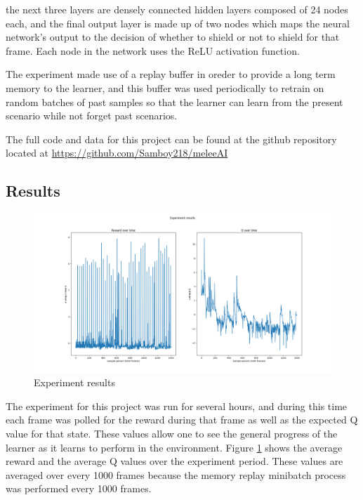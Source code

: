 \documentclass{article}
\begin{document}
the next three layers are densely connected hidden layers composed of 24 nodes each, and the final output layer is made up of
two nodes which maps the neural network's output to the decision of whether to shield or not to shield for that frame. Each node
in the network uses the ReLU activation function.

The experiment made use of a replay buffer in oreder to provide a long term memory to the learner, and this buffer was used periodically
to retrain on random batches of past samples so that the learner can learn from the present scenario while not forget past scenarios.

The full code and data for this project can be found at the github repository located at \url{https://github.com/Samboy218/meleeAI}

\subsection{Results}
\begin{figure}[ht]
    \centering
    \includegraphics[width=\textwidth]{experiment}
    \caption{Experiment results}
    \label{fig:experiment}
\end{figure}
The experiment for this project was run for several hours, and during this time each frame was polled for the reward during that frame as 
well as the expected Q value for that state. These values allow one to see the general progress of the learner as it learns to perform in the
environment. Figure \ref{fig:experiment} shows the average reward and the average Q values over the experiment period. These values are 
averaged over every 1000 frames because the memory replay minibatch process was performed every 1000 frames.
\end{document}

